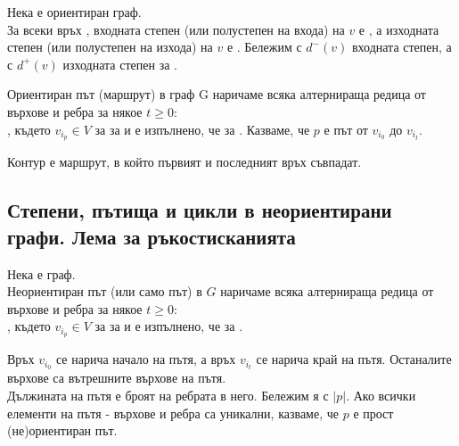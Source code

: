 \begin{definition}
    Нека \graf е ориентиран граф. \\
    За всеки връх , входната степен (или полустепен на входа) на \(v\) е 
    , а изходната степен (или полустепен на изхода) на \(v\) е
    . Бележим с \(d^-(v)\) входната степен, а с \(d^+(v)\) 
    изходната степен за .
\end{definition}

\begin{definition}
    Ориентиран път (маршрут) в граф G наричаме всяка алтернираща редица от върхове и ребра за някое \(t \ge 0\): \\
    , където 
    \(v_{i_p} \in V\) за  за  и е изпълнено, че 
     за . Казваме, че \(p\) е път 
    от \(v_{i_0}\) до \(v_{i_t}\).
\end{definition}

\begin{definition}
    Контур е маршрут, в който първият и последният връх съвпадат.
\end{definition}

\subsection{Степени, пътища и цикли в неориентирани графи. Лема за ръкостисканията}

\begin{definition}
    Нека \graf е граф. \\
    Неориентиран път (или само път) в \(G\) наричаме всяка алтернираща редица от върхове и ребра за 
    някое \(t \ge 0\): \\
    , където 
    \(v_{i_p} \in V\) за  за  и е изпълнено, че 
     за .
\end{definition}

\begin{note}
    Връх \(v_{i_0}\) се нарича начало на пътя, а връх \(v_{i_t}\) се нарича край на пътя. Останалите 
    върхове са вътрешните върхове на пътя. \\
    Дължината на пътя е броят на ребрата в него. Бележим я с \(|p|\).
    Ако всички елементи на пътя - върхове и ребра са уникални, казваме, че \(p\) е прост (не)ориентиран път.
\end{note}

